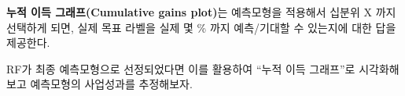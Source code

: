 \documentclass[
  letterpaper,
  chapter,a4paper,showtrims,openright,hidelinks]{oblivoir}
\newenvironment{Shaded}{\begin{snugshade}}{\end{snugshade}}
\newcommand{\AttributeTok}[1]{\textcolor[rgb]{0.40,0.45,0.13}{#1}}
\newcommand{\DecValTok}[1]{\textcolor[rgb]{0.68,0.00,0.00}{#1}}
\newcommand{\FunctionTok}[1]{\textcolor[rgb]{0.28,0.35,0.67}{#1}}
\newcommand{\NormalTok}[1]{\textcolor[rgb]{0.00,0.23,0.31}{#1}}
\newcommand{\OtherTok}[1]{\textcolor[rgb]{0.00,0.23,0.31}{#1}}
\newcommand{\SpecialCharTok}[1]{\textcolor[rgb]{0.37,0.37,0.37}{#1}}
\begin{document}
\textbf{누적 이득 그래프(Cumulative gains plot)}는 예측모형을 적용해서
십분위 X 까지 선택하게 되면, 실제 목표 라벨을 실제 몇 \% 까지
예측/기대할 수 있는지에 대한 답을 제공한다.

RF가 최종 예측모형으로 선정되었다면 이를 활용하여 ``누적 이득 그래프''로
시각화해보고 예측모형의 사업성과를 추정해보자.

\begin{Shaded}
\end{Shaded}
\end{document}
